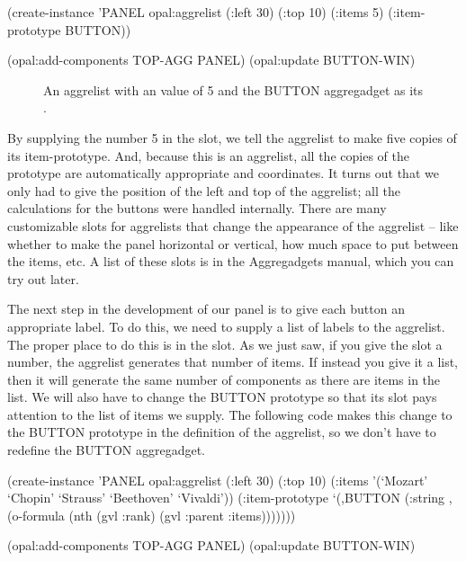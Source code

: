 \begin{programexample}
(create-instance 'PANEL opal:aggrelist
   (:left 30) (:top 10)
   (:items 5)
   (:item-prototype BUTTON))

(opal:add-components TOP-AGG PANEL)
(opal:update BUTTON-WIN)
\end{programexample}

\begin{figure}
\begin{center}
\end{center}
\caption{An aggrelist with an  value of 5 and the BUTTON
aggregadget as its .}
\end{figure}

By supplying the number 5 in the  slot, we tell the
aggrelist to make five copies of its item-prototype.  And, because
this is an aggrelist, all the copies of the prototype are automatically
appropriate  and  coordinates.  It turns out that
we only had to give the position of the left and top of the aggrelist;
all the calculations for the buttons were handled internally.
There are many customizable slots for aggrelists that change the
appearance of the aggrelist -- like whether to make the panel
horizontal or vertical, how much space to put between the items, etc.
A list of these slots is in the Aggregadgets manual, which you can try
out later.

The next step in the development of our panel is to give each button
an appropriate label.  To do this, we need to supply a list of
labels to the aggrelist.  The proper place to do this is in the
 slot.  As we just saw, if you give the  slot a
number, the aggrelist generates that number of items.  If instead you
give it a list, then it will generate the same number of components as
there are items in the list.  We will also have to change the BUTTON
prototype so that its  slot pays attention to the list of
items we supply.  The following code makes this change to the BUTTON
prototype in the definition of the aggrelist, so we don't have to
redefine the BUTTON aggregadget.

\begin{programexample}
(create-instance 'PANEL opal:aggrelist
   (:left 30) (:top 10)
   (:items '(`Mozart' `Chopin' `Strauss' `Beethoven' `Vivaldi'))
   (:item-prototype
    `(,BUTTON
      (:string ,(o-formula (nth (gvl :rank) (gvl :parent :items)))))))

(opal:add-components TOP-AGG PANEL)
(opal:update BUTTON-WIN)
\end{programexample}

